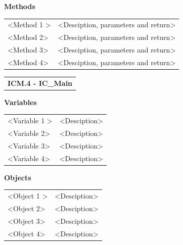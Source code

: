 \documentclass [10pt]{article}
\begin{document}
\textbf{Methods} 
\begin{longtable}{ p{ }  p{ }} \\ 

 
\rowcolor{tableCell} <Method 1 >& <Desciption, parameters and return>\\ 
<Method 2>& <Desciption, parameters and return>\\

\rowcolor{tableCell}<Method 3> & <Desciption, parameters and return> \\ 
<Method 4>& <Desciption, parameters and return> \\

\end{longtable}

\begin{longtable}{p{}}
\rowcolor{subsectionC}\textbf{ICM.4 - IC\_Main} \\
\end{longtable}
  

\textbf{Variables} 

\begin{longtable}{ p{ }  p{ }} \\ 

 
\rowcolor{tableCell} <Variable 1 >& <Desciption> \\ 
<Variable 2>& <Desciption> \\

\rowcolor{tableCell}<Variable 3> & <Desciption> \\ 
<Variable 4>& <Desciption> \\

\end{longtable}

\textbf{Objects} 
\begin{longtable}{ p{ }  p{ }} \\ 

 
\rowcolor{tableCell} <Object 1 >& <Desciption> \\ 
<Object 2>& <Desciption> \\

\rowcolor{tableCell}<Object 3> & <Desciption> \\ 
<Object 4>& <Desciption> \\

\end{longtable}
\end{document}
